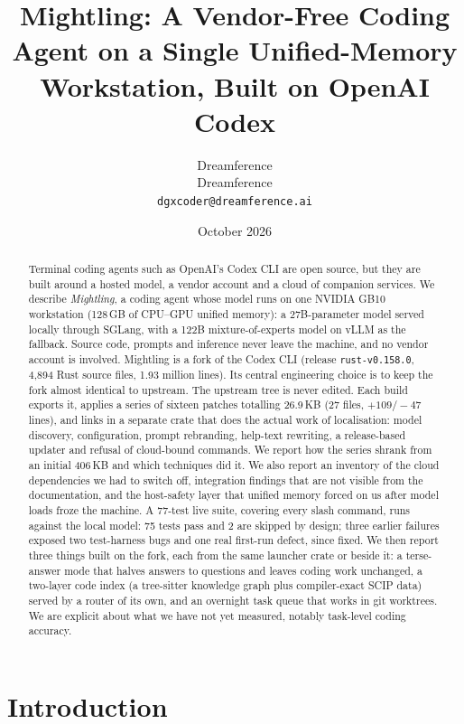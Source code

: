 \documentclass[11pt]{article}
\title{Mightling: A Vendor-Free Coding Agent on a Single Unified-Memory Workstation, Built on
OpenAI Codex}
\author{Dreamference\\
Dreamference\\
\texttt{dgxcoder@dreamference.ai}}
\date{October 2026}
\newcommand{\code}[1]{\texttt{#1}}
\begin{document}
\maketitle

\begin{abstract}
Terminal coding agents such as OpenAI's Codex CLI are open source, but they are built around a
hosted model, a vendor account and a cloud of companion services. We describe \emph{Mightling}, a
coding agent whose model runs on one NVIDIA GB10 workstation (128\,GB of CPU--GPU unified memory):
a 27B-parameter model served locally through SGLang, with a 122B mixture-of-experts model on
vLLM as the fallback. Source code, prompts and
inference never leave the machine, and no vendor account is involved. Mightling is a fork of
the Codex CLI (release \code{rust-v0.158.0}, 4{,}894 Rust source files, 1.93 million lines). Its
central engineering choice is to keep the fork almost identical to upstream. The upstream tree is
never edited. Each build exports it, applies a series of sixteen patches totalling 26.9\,KB (27 files,
$+109/-47$ lines), and links in a separate crate that does the actual work of localisation: model
discovery, configuration, prompt rebranding, help-text rewriting, a release-based updater and
refusal of cloud-bound commands. We report how the series shrank from an initial 406\,KB and which
techniques did it. We also report an inventory of the cloud dependencies we had to switch off,
integration findings that are not visible from the documentation, and the host-safety layer that
unified memory forced on us after model loads froze the machine. A 77-test live suite, covering
every slash command, runs against the local model: 75 tests pass and 2 are skipped by design; three
earlier failures exposed two test-harness bugs and one real first-run defect, since fixed. We then
report three things built on the fork, each from the same launcher crate or beside it: a
terse-answer mode that halves answers to questions and leaves coding work unchanged, a two-layer
code index (a tree-sitter knowledge graph plus compiler-exact SCIP data) served by a router of its
own, and an overnight task queue that works in git worktrees. We are explicit about what we have
not yet measured, notably task-level coding accuracy.
\end{abstract}

\section{Introduction}
\end{document}
